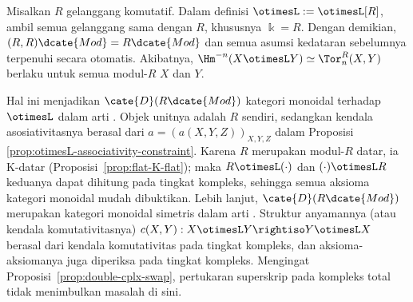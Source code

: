 \begin{contoh}\label{eg:commutative-otimesL}
	Misalkan $R$ gelanggang komutatif. Dalam definisi
	$\otimesL := \otimesL[R]$, ambil semua gelanggang sama dengan $R$,
	khususnya $\Bbbk=R$. Dengan demikian,
	$(R,R)\dcate{Mod}=R\dcate{Mod}$ dan semua asumsi kedataran sebelumnya
	terpenuhi secara otomatis. Akibatnya,
	$\Hm^{-n}(X \otimesL Y) \simeq \Tor^R_n(X,Y)$ berlaku untuk semua
	modul-$R$ $X$ dan $Y$.
	
	Hal ini menjadikan $\cate{D}(R\dcate{Mod})$ kategori monoidal terhadap
	$\otimesL$ dalam arti \cite[\S 3.1]{Li1}. Objek unitnya adalah $R$
	sendiri, sedangkan kendala asosiativitasnya berasal dari
	$a=(a(X,Y,Z))_{X,Y,Z}$ dalam Proposisi
	\ref{prop:otimesL-associativity-constraint}. Karena $R$ merupakan
	modul-$R$ datar, ia K-datar (Proposisi~\ref{prop:flat-K-flat}); maka
	$R \otimesL (\cdot)$ dan $(\cdot) \otimesL R$ keduanya dapat dihitung
	pada tingkat kompleks, sehingga semua aksioma kategori monoidal mudah
	dibuktikan. Lebih lanjut, $\cate{D}(R\dcate{Mod})$ merupakan kategori
	monoidal simetris dalam arti \cite[Definisi 3.3.1]{Li1}. Struktur
	anyamannya (atau kendala komutativitasnya)
	$c(X,Y):X\otimesL Y\rightiso Y\otimesL X$ berasal dari kendala
	komutativitas pada tingkat kompleks, dan aksioma-aksiomanya juga diperiksa
	pada tingkat kompleks. Mengingat Proposisi~\ref{prop:double-cplx-swap},
	pertukaran superskrip pada kompleks total tidak menimbulkan masalah di sini.
\end{contoh}

